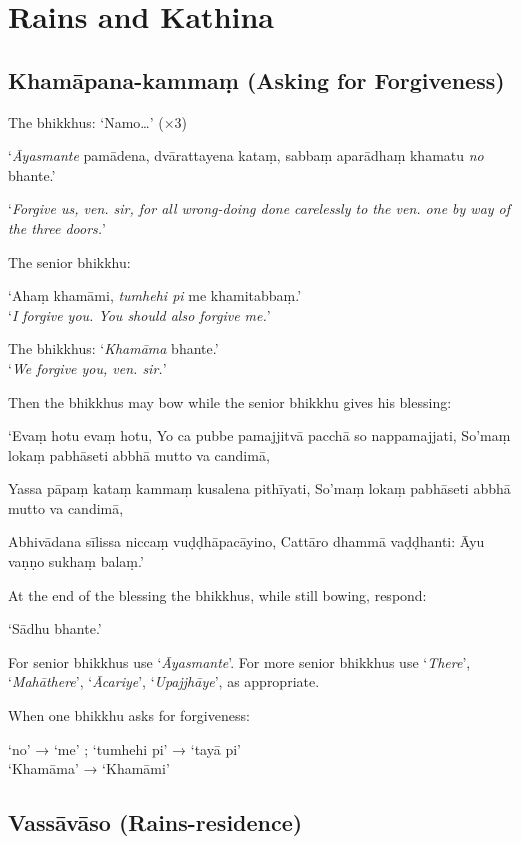 \chapter{Rains and Kathina}

\section{Khamāpana-kammaṃ (Asking for Forgiveness)}

The bhikkhus: ‘Namo…’ (×3)

‘\emph{Āyasmante} pamādena, dvārattayena kataṃ, sabbaṃ aparādhaṃ khamatu
\emph{no} bhante.’

‘\emph{Forgive us, ven. sir, for all wrong-doing done carelessly to the ven. one
  by way of the three doors.}’

The senior bhikkhu:

‘Ahaṃ khamāmi, \emph{tumhehi pi} me khamitabbaṃ.’\\
‘\emph{I forgive you. You should also forgive me.}’

The bhikkhus: ‘\emph{Khamāma} bhante.’\\
‘\emph{We forgive you, ven. sir.}’

Then the bhikkhus may bow while the senior bhikkhu gives his blessing:

‘Evaṃ hotu evaṃ hotu, Yo ca pubbe pamajjitvā pacchā so nappamajjati, So'maṃ
lokaṃ pabhāseti abbhā mutto va candimā, 

Yassa pāpaṃ kataṃ kammaṃ kusalena pithīyati, So'maṃ lokaṃ pabhāseti abbhā mutto
va candimā, 

Abhivādana sīlissa niccaṃ vuḍḍhāpacāyino, Cattāro dhammā vaḍḍhanti: Āyu vaṇṇo
sukhaṃ balaṃ.’ 

At the end of the blessing the bhikkhus, while still bowing, respond:

‘Sādhu bhante.’

For senior bhikkhus use ‘\emph{Āyasmante}’. For more senior bhikkhus use
‘\emph{There}’, ‘\emph{Mahāthere}’, ‘\emph{Ācariye}’, ‘\emph{Upajjhāye}’, as
appropriate.

When one bhikkhu asks for forgiveness:

‘no’ → ‘me’ ; ‘tumhehi pi’ → ‘tayā pi’\\
‘Khamāma’ → ‘Khamāmi’

\section{Vassāvāso (Rains-residence)}

